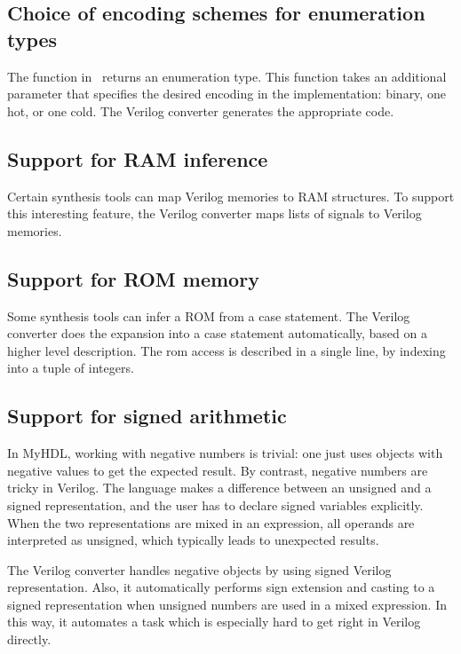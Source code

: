 \subsection{Choice of encoding schemes for enumeration types\label{conv-features-enum}}
The  function in \myhdl\ returns an enumeration type. This
function takes an additional parameter  that specifies the
desired encoding in the implementation: binary, one hot, or one cold.
The Verilog converter generates the appropriate code.

\subsection{Support for RAM inference \label{conf-features-ram}}
Certain synthesis tools can map Verilog memories to RAM
structures. To support this interesting feature, the Verilog converter
maps lists of signals to Verilog memories.

\subsection{Support for ROM memory \label{conf-features-rom}}
Some synthesis tools can infer a ROM
from a case statement. The Verilog converter does the expansion into
a case statement automatically, based on a higher level
description. The rom access is described in a single line, by
indexing into a tuple of integers.

\subsection{Support for signed arithmetic \label{conf-features-signed}}
In MyHDL, working with negative numbers is trivial: one just uses
 objects with negative values to get the expected result.
By contrast, negative numbers are tricky in Verilog. The language
makes a difference between an unsigned and a signed representation,
and the user has to declare signed variables explicitly.  When the two
representations are mixed in an expression, all operands are
interpreted as unsigned, which typically leads to unexpected results.

The Verilog converter handles negative  objects by using
signed Verilog representation. Also, it automatically performs sign
extension and casting to a signed representation when unsigned numbers
are used in a mixed expression. In this way, it automates a task which
is especially hard to get right in Verilog directly.

